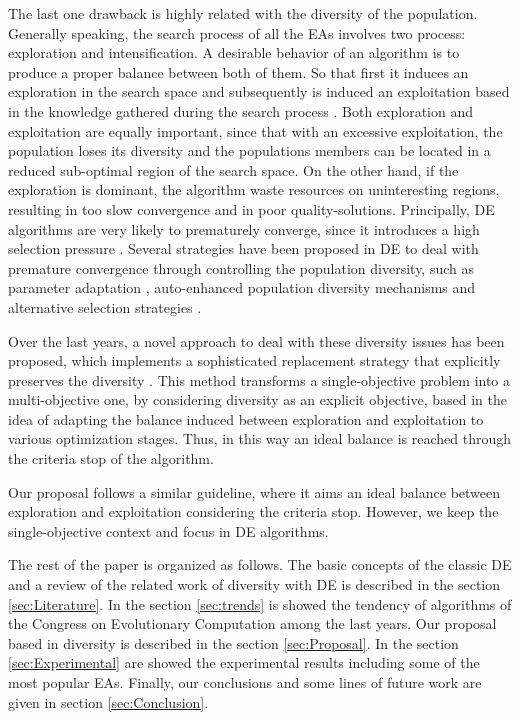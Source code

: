 %
The last one drawback is highly related with the diversity of the population.
%
Generally speaking, the search process of all the EAs involves two process: exploration and intensification.
%
A desirable behavior of an algorithm is to produce a proper balance between both of them.
%
So that first it induces an exploration in the search space and subsequently is induced an exploitation based in the knowledge gathered during the search process \cite{zaharie2003control}.
%
Both exploration and exploitation are equally important, since that with an excessive exploitation, the population loses its diversity and the populations members can be located in a reduced sub-optimal region of the search space.
%
On the other hand, if the exploration is dominant, the algorithm waste resources on uninteresting regions, resulting in too slow convergence and in poor quality-solutions.
%
Principally, DE algorithms are very likely to prematurely converge, since it introduces a high selection pressure \cite{sa2008exploration}.
%
Several strategies have been proposed in DE to deal with premature convergence through controlling the population diversity, such as parameter adaptation \cite{zaharie2003control}, auto-enhanced population diversity mechanisms \cite{yang2015differential} and alternative selection strategies \cite{sa2008exploration}.


Over the last years, a novel approach to deal with these diversity issues has been proposed, which implements a sophisticated replacement strategy that explicitly preserves the diversity \cite{segura2016novel}.
%
This method transforms a single-objective problem into a multi-objective one, by considering diversity as an explicit objective, based in the idea of adapting the balance induced between exploration and exploitation to various optimization stages.
%
Thus, in this way an ideal balance is reached through the criteria stop of the algorithm.
%

Our proposal follows a similar guideline, where it aims an ideal balance between exploration and exploitation considering the criteria stop.
%
However, we keep the single-objective context and focus in DE algorithms.



The rest of the paper is organized as follows.
%
The basic concepts of the classic DE and a review of the related work of diversity with DE is described in the section \ref{sec:Literature}.
%
In the section \ref{sec:trends} is showed the tendency of algorithms of the Congress on Evolutionary Computation among the last years.
%
Our proposal based in diversity is described in the section \ref{sec:Proposal}.
%
In the section \ref{sec:Experimental} are showed the experimental results including some of the most popular EAs.
%
Finally, our conclusions and some lines of future work are given in section \ref{sec:Conclusion}.
